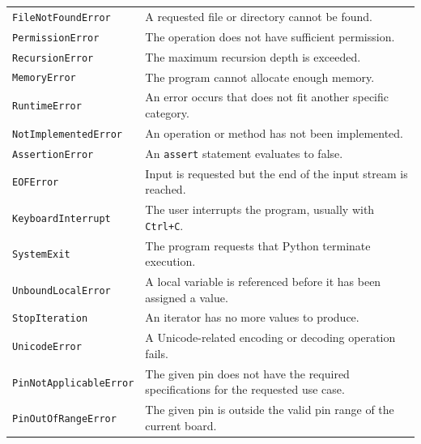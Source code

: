 \documentclass[11pt]{book}
\begin{document}
\begin{longtable}{p{} p{}}
    \texttt{FileNotFoundError} &
    A requested file or directory cannot be found. \\

    \texttt{PermissionError} &
    The operation does not have sufficient permission. \\

    \texttt{RecursionError} &
    The maximum recursion depth is exceeded. \\

    \texttt{MemoryError} &
    The program cannot allocate enough memory. \\

    \texttt{RuntimeError} &
    An error occurs that does not fit another specific category. \\

    \texttt{NotImplementedError} &
    An operation or method has not been implemented. \\

    \texttt{AssertionError} &
    An \texttt{assert} statement evaluates to false. \\

    \texttt{EOFError} &
    Input is requested but the end of the input stream is reached. \\

    \texttt{KeyboardInterrupt} &
    The user interrupts the program, usually with \texttt{Ctrl+C}. \\

    \texttt{SystemExit} &
    The program requests that Python terminate execution. \\

    \texttt{UnboundLocalError} &
    A local variable is referenced before it has been assigned a value. \\

    \texttt{StopIteration} &
    An iterator has no more values to produce. \\

    \texttt{UnicodeError} &
    A Unicode-related encoding or decoding operation fails. \\

    \texttt{PinNotApplicableError} &
    The given pin does not have the required specifications for the requested use case. \\

    \texttt{PinOutOfRangeError} &
    The given pin is outside the valid pin range of the current board. \\


\end{longtable}
\end{document}
